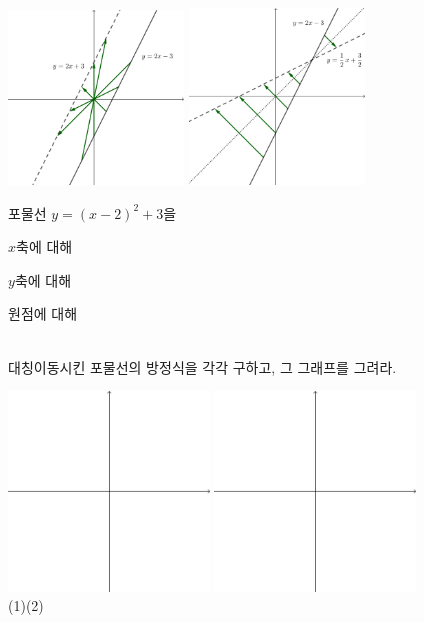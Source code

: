 \documentclass{oblivoir}
\begin{document}
\begin{center}
\includegraphics[width=0.35\textwidth]{rreflect_4-3}\quad
\includegraphics[width=0.35\textwidth]{rreflect_4-4}\\
\end{center}

\newpage
%
\prob{}\label{rreflect5}
포물선 \(y=(x-2)^2+3\)을\\[10pt]
\begin{enumerate*}[itemjoin={,\quad}]
\item
\(x\)축에 대해
\item
\(y\)축에 대해
\item
원점에 대해
\end{enumerate*}
\\[10pt]
대칭이동시킨 포물선의 방정식을 각각 구하고, 그 그래프를 그려라.
\bigskip
\begin{center}
\includegraphics[width=0.4\textwidth]{xyaxes}\quad
\includegraphics[width=0.4\textwidth]{xyaxes}\\
(1)\qquad\qquad\qquad\qquad\qquad\qquad\quad (2)
\end{center}
\end{document}
